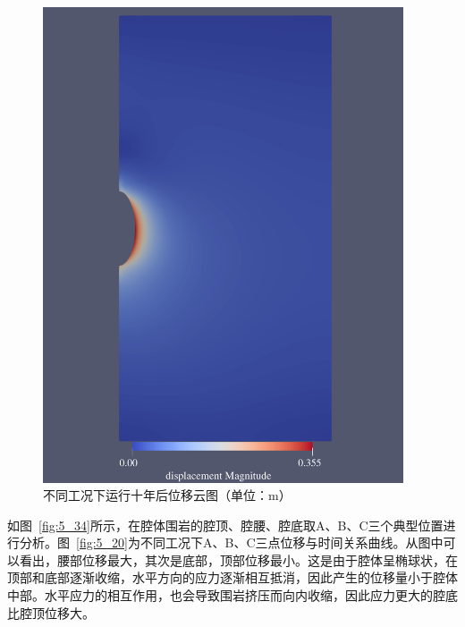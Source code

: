 \begin{figure}[ht!]
{\begin{minipage}{6.2cm}
            \includegraphics[width=0.95\textwidth]{img/chap5/位移/工况四位移云图.pdf}
        \end{minipage}
    }
    \caption{不同工况下运行十年后位移云图（单位：\si{m}）}
    \label{fig:4weiyi}
\end{figure}



如图~\ref{fig:5_34}所示，在腔体围岩的腔顶、腔腰、腔底取A、B、C三个典型位置进行分析。图~\ref{fig:5_20}为不同工况下A、B、C三点位移与时间关系曲线。从图中可以看出，腰部位移最大，其次是底部，顶部位移最小。这是由于腔体呈椭球状，在顶部和底部逐渐收缩，水平方向的应力逐渐相互抵消，因此产生的位移量小于腔体中部。水平应力的相互作用，也会导致围岩挤压而向内收缩，因此应力更大的腔底比腔顶位移大。



